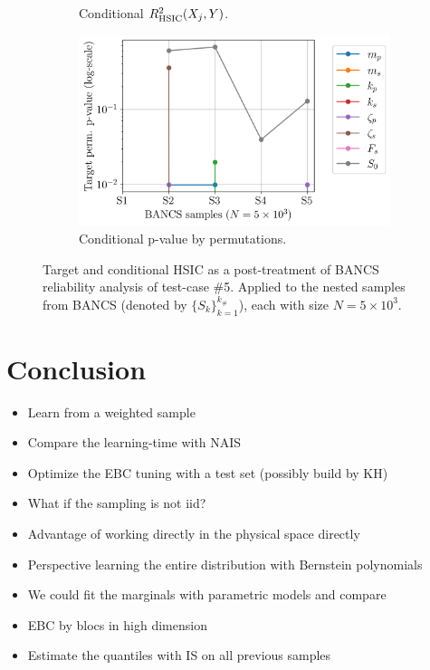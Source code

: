 \begin{figure}
\begin{subfigure}[b]{0.4\linewidth}
        \caption{Conditional $R^2_{\mathrm{HSIC}}(X_j, Y)$.}
    \end{subfigure}
    \begin{subfigure}[b]{0.4\linewidth}
        \centering
        \includegraphics[width=\linewidth]{part3/figures/BANCS/oscillator_Cpvalue_permutation.png}
        \caption{Conditional p-value by permutations.}
    \end{subfigure}
    \caption{Target and conditional HSIC as a post-treatment of BANCS reliability analysis of test-case \#5. 
                Applied to the nested samples from BANCS (denoted by $\{S_k\}_{k=1}^{k_\#}$), each with size $N=5\times10^3$.}
    \label{fig:rosa_oscillator}
\end{figure}


\section{Conclusion}
\begin{itemize}
    \item Learn from a weighted sample
    \item Compare the learning-time with NAIS
    \item Optimize the EBC tuning with a test set (possibly build by KH)
    \item What if the sampling is not iid?
    \item Advantage of working directly in the physical space directly
    \item Perspective learning the entire distribution with Bernstein polynomials
    \item We could fit the marginals with parametric models and compare
    \item EBC by blocs in high dimension 
    \item Estimate the quantiles with IS on all previous samples
\end{itemize}


